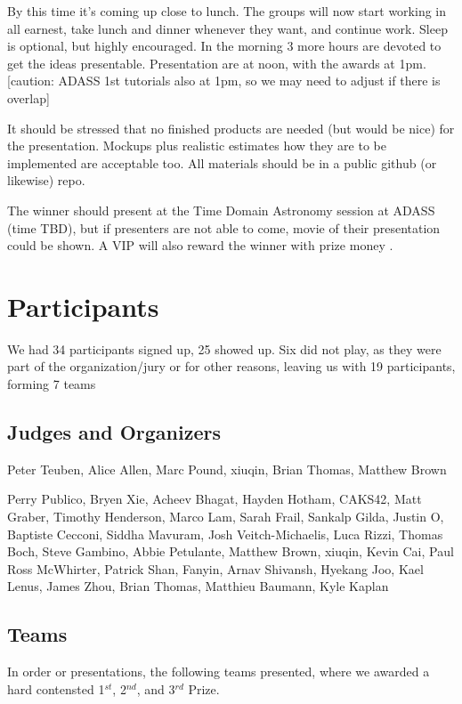 \documentclass[11pt,twoside]{article}
\begin{document}
By this time it's coming up close to lunch. The groups will now start
working in all earnest, take lunch and dinner whenever they want, and
continue work. Sleep is optional, but highly encouraged. In the
morning 3 more hours are devoted to get the ideas presentable.
Presentation are at noon, with the awards at 1pm. [caution: ADASS 1st
  tutorials also at 1pm, so we may need to adjust if there is overlap]

It should be stressed that no finished products are needed (but would
be nice) for the presentation. Mockups plus realistic estimates how
they are to be implemented are acceptable too. All materials should
be in a public github (or likewise) repo.

The winner should present at the Time Domain Astronomy session at
ADASS (time TBD), but if presenters are not able to come, movie of
their presentation could be shown.  A VIP will also reward the winner
with prize money .


\section{Participants}

We had 34 participants signed up, 25 showed up. 
Six did not play, as they were part of the organization/jury or for
other reasons, leaving us with 19 participants, forming 7 teams

\subsection*{Judges and Organizers}

Peter Teuben,
Alice Allen,
Marc Pound,
xiuqin,
Brian Thomas,
Matthew Brown

Perry Publico, 
Bryen Xie, 
Acheev Bhagat, 
Hayden Hotham, 
CAKS42, 
Matt Graber, 
Timothy Henderson, 
Marco Lam, 
Sarah Frail, 
Sankalp Gilda, 
Justin O, 
Baptiste Cecconi, 
Siddha Mavuram, 
Josh Veitch-Michaelis, 
Luca Rizzi, 
Thomas Boch, 
Steve Gambino, 
Abbie Petulante, 
Matthew Brown, 
xiuqin, 
Kevin Cai, 
Paul Ross McWhirter, 
Patrick Shan, 
Fanyin, 
Arnav Shivansh, 
Hyekang Joo, 
Kael Lenus, 
James Zhou, 
Brian Thomas, 
Matthieu Baumann, 
Kyle Kaplan


\subsection{Teams}

In order or presentations, the following teams presented, where we awarded
a hard contensted 1$^{st}$, 2$^{nd}$, and 3$^{rd}$ Prize.
\end{document}
